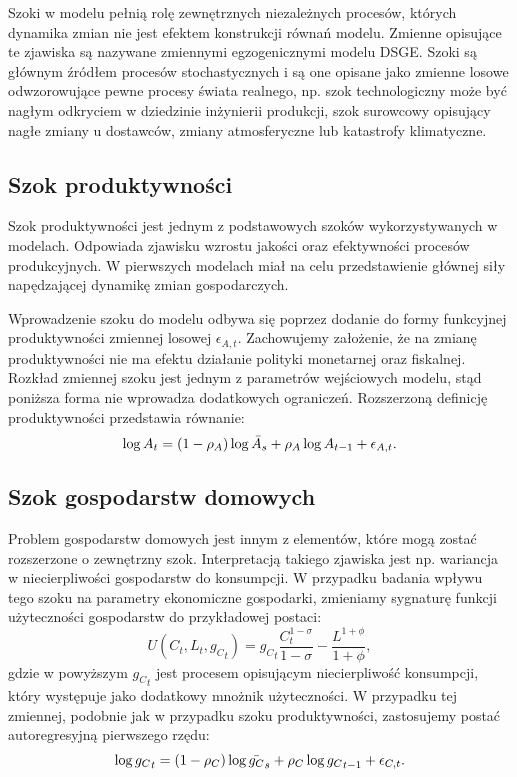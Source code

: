 Szoki w modelu pełnią rolę zewnętrznych niezależnych procesów, których dynamika zmian nie jest efektem konstrukcji równań modelu. Zmienne opisujące te zjawiska są nazywane zmiennymi egzogenicznymi modelu DSGE. Szoki są głównym źródłem procesów stochastycznych i są one opisane jako zmienne losowe odwzorowujące pewne procesy świata realnego, np. szok technologiczny może być nagłym odkryciem w dziedzinie inżynierii produkcji, szok surowcowy opisujący nagłe zmiany u dostawców, zmiany atmosferyczne lub katastrofy klimatyczne.


\subsection{Szok produktywności}
\label{sec:shocks_prod}

Szok produktywności jest jednym z podstawowych szoków wykorzystywanych w modelach. Odpowiada zjawisku wzrostu jakości oraz efektywności procesów produkcyjnych. W pierwszych modelach miał na celu przedstawienie głównej siły napędzającej dynamikę zmian gospodarczych. 

Wprowadzenie szoku do modelu odbywa się poprzez dodanie do formy funkcyjnej produktywności zmiennej losowej $\epsilon_{A,t}$. Zachowujemy założenie, że na zmianę produktywności nie ma efektu działanie polityki monetarnej oraz fiskalnej. Rozkład zmiennej szoku jest jednym z parametrów wejściowych modelu, stąd poniższa forma nie wprowadza dodatkowych ograniczeń. Rozszerzoną definicję produktywności przedstawia równanie:
\begin{equation}
        \log{A_t} = (1-\rho_A)\log {\bar{A}_s} + \rho_A \log {A_{t-1}} + \epsilon_{A,t}.
\end{equation}

\subsection{Szok gospodarstw domowych}

Problem gospodarstw domowych jest innym z elementów, które mogą zostać rozszerzone o zewnętrzny szok. Interpretacją takiego zjawiska jest np. wariancja w niecierpliwości gospodarstw do konsumpcji. W przypadku badania wpływu tego szoku na parametry ekonomiczne gospodarki, zmieniamy sygnaturę funkcji użyteczności gospodarstw do przykładowej postaci:
\begin{equation}
    U(C_t, L_t, {g_C}_t) = {g_C}_t\frac{C_t^{1-\sigma}}{1-\sigma} - \frac{L^{1+\phi}}{1+\phi},
\end{equation}
gdzie w powyższym ${g_C}_t$ jest procesem opisującym niecierpliwość konsumpcji, który występuje jako dodatkowy mnożnik użyteczności. W przypadku tej zmiennej, podobnie jak w przypadku szoku produktywności, zastosujemy postać autoregresyjną pierwszego rzędu:
\begin{equation}
        \log{{g_C}_t} = (1-\rho_C)\log {\bar{g_C}_s} + \rho_C \log {{g_C}_{t-1}} + \epsilon_{C,t}.
\end{equation}

